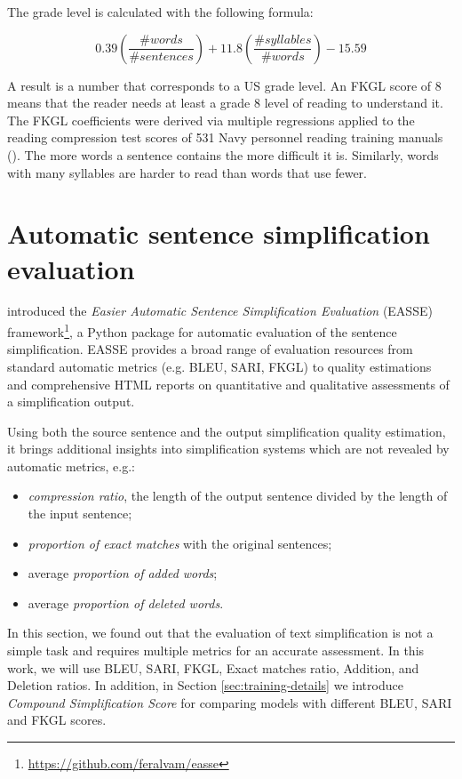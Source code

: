 The grade level is calculated with the following formula:

\begin{equation}
0.39\left(\frac{\#words}{\#sentences}\right)+11.8\left(\frac{\#syllables}{\#words}\right)-15.59
\end{equation}

\bigskip
A result is a number that corresponds to a US grade level. An FKGL score of 8 means that the reader needs at least a grade 8 level of reading to understand it. The FKGL coefficients were derived via multiple regressions applied to the reading compression test scores of 531 Navy personnel reading training manuals (\cite{xu-etal-2016-optimizing}). The more words a sentence contains the more difficult it is. Similarly, words with many syllables are harder to read than words that use fewer.

\section{Automatic sentence simplification evaluation}
\label{sec:easse}

\cite{alva-manchego-etal-2019-easse} introduced the \emph{Easier Automatic Sentence Simplification Evaluation} (EASSE) framework\footnote{\href{https://github.com/feralvam/easse}{https://github.com/feralvam/easse}}, a Python package for automatic evaluation of the sentence simplification. EASSE provides a broad range of evaluation resources from standard automatic metrics (e.g. BLEU, SARI, FKGL) to quality estimations and comprehensive HTML reports on quantitative and qualitative assessments of a  simplification output.

Using both the source sentence and the output simplification quality estimation, it brings additional insights into simplification systems which are not revealed by automatic metrics, e.g.: 

\begin{itemize}
    \item \emph{compression ratio}, the length of the output sentence divided by the length of the input sentence;
    \item \emph{proportion of exact matches} with the original sentences;
    \item average \emph{proportion of added words};
    \item average \emph{proportion of deleted words}.
\end{itemize}

\bigskip
In this section, we found out that the evaluation of text simplification is not a simple task and requires multiple metrics for an accurate assessment. In this work, we will use BLEU, SARI, FKGL, Exact matches ratio, Addition, and Deletion ratios. In addition, in Section \ref{sec:training-details} we introduce \textit{Compound Simplification Score} for comparing models with different BLEU, SARI and FKGL scores.


\endinput